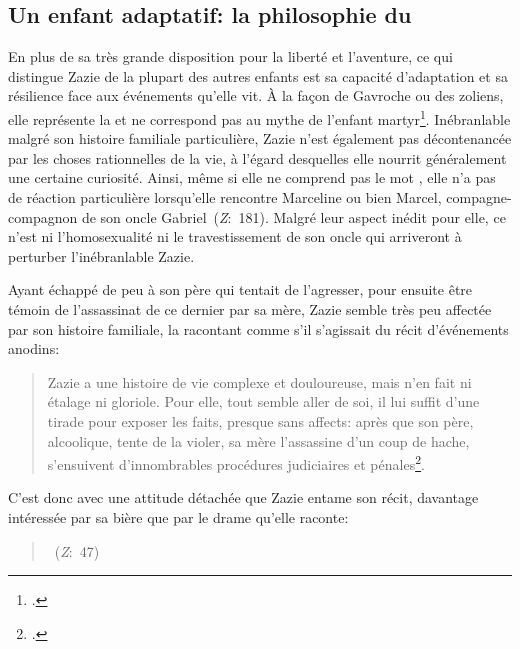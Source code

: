 \subsection{Un enfant adaptatif: la philosophie du }
En plus de sa très grande disposition pour la liberté et l'aventure, ce qui distingue Zazie de la plupart des autres enfants est sa capacité d'adaptation et sa résilience face aux événements qu'elle vit.
À la façon de Gavroche ou des  zoliens, elle représente la  et ne correspond pas au mythe de l'enfant martyr\footcite[90]{Maurin2007}.
Inébranlable malgré son histoire familiale particulière, Zazie n'est également pas décontenancée par les choses rationnelles de la vie, à l'égard desquelles elle nourrit généralement une certaine curiosité.
Ainsi, même si elle ne comprend pas le mot , elle n'a pas de réaction particulière lorsqu'elle rencontre Marceline ou bien Marcel, compagne-compagnon de son oncle Gabriel~(\textit{Z}:~181).
Malgré leur aspect inédit pour elle, ce n'est ni l'homosexualité ni le travestissement de son oncle qui arriveront à perturber l'inébranlable Zazie.
\par
Ayant échappé de peu à son père qui tentait de l'agresser, pour ensuite être témoin de l'assassinat de ce dernier par sa mère, Zazie semble très peu affectée par son histoire familiale, la racontant comme s'il s'agissait du récit d'événements anodins:
\begin{quote}
  \begin{singlespace}
    \small
    Zazie a une histoire de vie complexe et douloureuse, mais n'en fait ni étalage ni gloriole. Pour elle, tout semble aller de soi, il lui suffit d'une tirade pour exposer les faits, presque sans affects: après que son père, alcoolique, tente de la violer, sa mère l'assassine d'un coup de hache, s'ensuivent d'innombrables procédures judiciaires et pénales\footcite[88]{Maurin2007}.
    \normalsize
  \end{singlespace}
\end{quote}
C'est donc avec une attitude détachée que Zazie entame son récit, davantage intéressée par sa bière que par le drame qu'elle raconte:
\begin{quote}
  \begin{singlespace}
    \small
    ~(\textit{Z}:~47)
    \normalsize
  \end{singlespace}
\end{quote}
